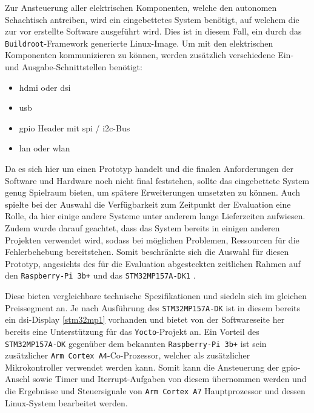 Zur Ansteuerung aller elektrischen Komponenten, welche den autonomen
Schachtisch antreiben, wird ein eingebettetes System benötigt, auf
welchem die zur vor erstellte Software ausgeführt wird. Dies ist in
diesem Fall, ein durch das \passthrough{\lstinline!Buildroot!}-Framework
generierte Linux-Image. Um mit den elektrischen Komponenten
kommunizieren zu können, werden zusätzlich verschiedene Ein- und
Ausgabe-Schnittstellen benötigt:

\begin{itemize}
\tightlist
\item
  \gls{hdmi} oder \gls{dsi}
\item
  \gls{usb}
\item
  \gls{gpio} Header mit \gls{spi} / \gls{i2c}-Bus
\item
  \gls{lan} oder \gls{wlan}
\end{itemize}

Da es sich hier um einen Prototyp handelt und die finalen Anforderungen
der Software und Hardware noch nicht final feststehen, sollte das
eingebettete System genug Spielraum bieten, um spätere Erweiterungen
umsetzten zu können. Auch spielte bei der Auswahl die Verfügbarkeit zum
Zeitpunkt der Evaluation eine Rolle, da hier einige andere Systeme unter
anderem lange Lieferzeiten aufwiesen. Zudem wurde darauf geachtet, dass
das System bereits in einigen anderen Projekten verwendet wird, sodass
bei möglichen Problemen, Ressourcen für die Fehlerbehebung bereitstehen.
Somit beschränkte sich die Auswahl für diesen Prototyp, angesichts des
für die Evaluation abgesteckten zeitlichen Rahmen auf den
\passthrough{\lstinline!Raspberry-Pi 3b+!} und das
\passthrough{\lstinline!STM32MP157A-DK1!} \label{ref}.

Diese bieten vergleichbare technische Spezifikationen und siedeln sich
im gleichen Preissegment an. Je nach Ausführung des
\passthrough{\lstinline!STM32MP157A-DK!} ist in diesem bereits ein
\gls{dsi}-Display \ref{stm32mp1} vorhanden und bietet von der
Softwareseite her bereits eine Unterstützung für das
\passthrough{\lstinline!Yocto!}-Projekt an. Ein Vorteil des
\passthrough{\lstinline!STM32MP157A-DK!} gegenüber dem bekannten
\passthrough{\lstinline!Raspberry-Pi 3b+!} ist sein zusätzlicher
\passthrough{\lstinline!Arm Cortex A4!}-Co-Prozessor, welcher als
zusätzlicher Mikrokontroller verwendet werden kann. Somit kann die
Ansteuerung der \gls{gpio}-Anschl sowie Timer und Iterrupt-Aufgaben von
diesem übernommen werden und die Ergebnisse und Steuersignale von
\passthrough{\lstinline!Arm Cortex A7!} Hauptprozessor und dessen
Linux-System bearbeitet werden.

